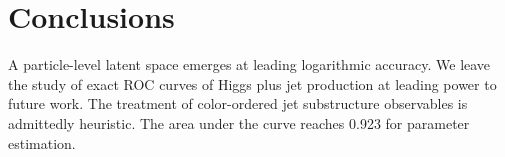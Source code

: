 \section{Conclusions}\label{sec:conclusions}

A particle-level latent space emerges at leading logarithmic accuracy.
We leave the study of exact ROC curves of Higgs plus jet production at
leading power to future work. The treatment of color-ordered jet
substructure observables is admittedly heuristic. The area under the
curve reaches 0.923 for parameter estimation.

